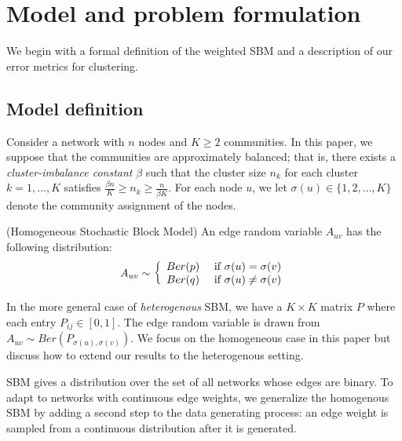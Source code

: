 
\section{Model and problem formulation}
\label{sec:formulation}

We begin with a formal definition of the weighted SBM and a description of our error metrics for clustering.

\subsection{Model definition}

Consider a network with $n$ nodes and $K \geq 2$ communities. In this paper, we suppose that the communities are approximately balanced; that is, there exists a \emph{cluster-imbalance constant} $\beta$ such that the cluster size $n_k$ for each cluster $k = 1, \dots, K$ satisfies $\frac{\beta n}{K} \geq n_k \geq \frac{n}{\beta K}$. For each node $u$, we let $\sigma(u) \in \{1,2, \dots, K\}$ denote the community assignment of the nodes. 

\begin{definition} (Homogeneous Stochastic Block Model) An edge random variable $A_{uv}$ has the following distribution:
\[
A_{uv} \sim \left\{ \begin{array}{cc}
 Ber(p) & \textrm{ if } \sigma(u) = \sigma(v) \\
 Ber(q) & \textrm{ if } \sigma(u) \neq \sigma(v) 
\end{array} \right.
\]
\end{definition}

In the more general case of \emph{heterogenous} SBM, we have a $K \times K$ matrix $P$ where each entry $P_{ij} \in [0,1]$. The edge random variable is drawn from $A_{uv} \sim Ber(P_{\sigma(u), \sigma(v)})$. We focus on the homogeneous case in this paper but discuss how to extend our results to the heterogenous setting.

SBM gives a distribution over the set of all networks whose edges are binary. To adapt to networks with continuous edge weights, we generalize the homogenous SBM by adding a second step to the data generating process: an edge weight is sampled from a continuous distribution after it is generated. 

